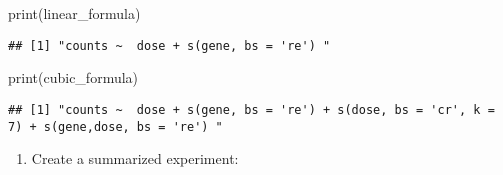 \documentclass[
]{article}
\newenvironment{Shaded}{\begin{snugshade}}{\end{snugshade}}
\newcommand{\AttributeTok}[1]{\textcolor[rgb]{0.77,0.63,0.00}{#1}}
\newcommand{\FunctionTok}[1]{\textcolor[rgb]{0.00,0.00,0.00}{#1}}
\newcommand{\NormalTok}[1]{#1}
\newcommand{\OtherTok}[1]{\textcolor[rgb]{0.56,0.35,0.01}{#1}}
\newcommand{\SpecialCharTok}[1]{\textcolor[rgb]{0.00,0.00,0.00}{#1}}
\newcommand{\StringTok}[1]{\textcolor[rgb]{0.31,0.60,0.02}{#1}}
\providecommand{\tightlist}{%
  \setlength{\itemsep}{0pt}\setlength{\parskip}{0pt}}
\begin{document}
\begin{Shaded}
\begin{Highlighting}[]
\FunctionTok{print}\NormalTok{(linear\_formula)}
\end{Highlighting}
\end{Shaded}

\begin{verbatim}
## [1] "counts ~  dose + s(gene, bs = 're') "
\end{verbatim}

\begin{Shaded}
\begin{Highlighting}[]
\FunctionTok{print}\NormalTok{(cubic\_formula)}
\end{Highlighting}
\end{Shaded}

\begin{verbatim}
## [1] "counts ~  dose + s(gene, bs = 're') + s(dose, bs = 'cr', k = 7) + s(gene,dose, bs = 're') "
\end{verbatim}

\begin{enumerate}
\def\labelenumi{\arabic{enumi}.}
\setcounter{enumi}{1}
\tightlist
\item
  Create a summarized experiment:
\end{enumerate}

\begin{Shaded}
\end{Shaded}
\end{document}
